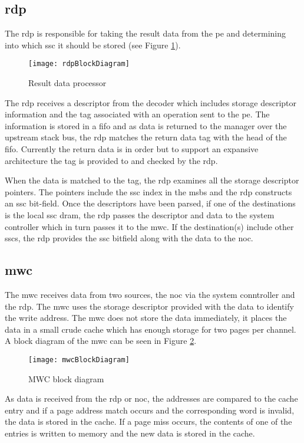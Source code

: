 \subsection{\Acf{rdp}}
\label{sec:RDP}
The \ac{rdp} is responsible for taking the result data from the \ac{pe} and determining into which \ac{ssc} it should be stored (see Figure \ref{fig:RDP block diagram}).

\begin{figure}[h]
\centering
\captionsetup{justification=centering}
\captionsetup{width=.9\linewidth}
\centerline{
\mbox{\texttt{[image: rdpBlockDiagram]}}
}
\center\caption{Result data processor}
\label{fig:RDP block diagram}
\end{figure}

The \ac{rdp} receives a descriptor from the decoder which includes storage descriptor information and the tag associated with an operation sent to the \ac{pe}.
The information is stored in a \ac{fifo} and as data is returned to the manager over the upstream stack bus, the \ac{rdp} matches the return data tag with the head of the \ac{fifo}.
Currently the return data is in order but to support an expansive architecture the tag is provided to and checked by the \ac{rdp}.

When the data is matched to the tag, the \ac{rdp} examines all the storage descriptor pointers. The pointers include the \ac{ssc} index in the \acp{msb} and the \ac{rdp} constructs an \ac{ssc} bit-field.
Once the descriptors have been parsed, if one of the destinations is the local \ac{ssc} \ac{dram}, the \ac{rdp} passes the descriptor and data to the system controller which in turn passes it to the \ac{mwc}.
If the destination(s) include other \acp{ssc}, the \ac{rdp} provides the \ac{ssc} bitfield along with the data to the \ac{noc}.


\subsection{\Acf{mwc}}
\label{sec:MWC}

The \acf{mwc} receives data from two sources, the \ac{noc} via the system conntroller and the \ac{rdp}.
The \ac{mwc} uses the storage descriptor provided with the data to identify the write address.
The \ac{mwc} does not store the data immediately, it places the data in a small crude cache which has enough storage for two pages per channel.
A block diagram of the \ac{mwc} can be seen in Figure \ref{fig:MWC block diagram}.
\begin{figure}[h]
\centering
\captionsetup{justification=centering}
\captionsetup{width=.9\linewidth}
\centerline{
\mbox{\texttt{[image: mwcBlockDiagram]}}
}
\center\caption{MWC block diagram}
\label{fig:MWC block diagram}
\end{figure}
As data is received from the \ac{rdp} or \ac{noc}, the addresses are compared to the cache entry and if a page address match occurs and the corresponding word is invalid, the data is stored in the cache.
If a page miss occurs, the contents of one of the entries is written to memory and the new data is stored in the cache.

